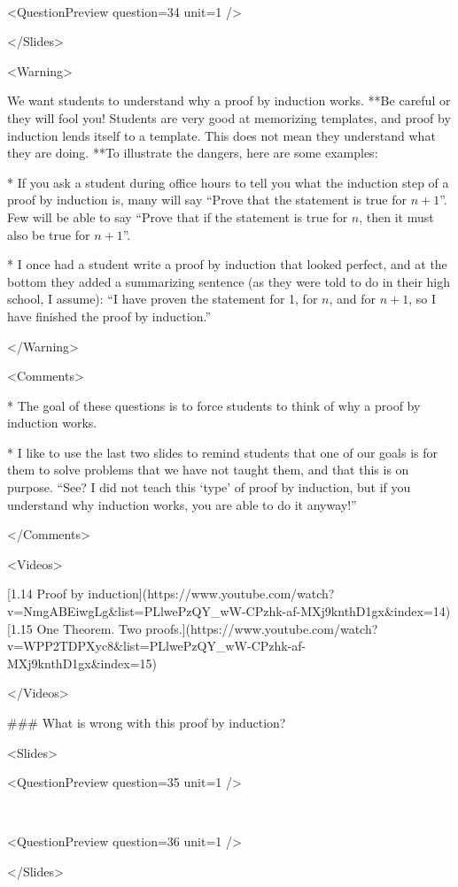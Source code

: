  

<QuestionPreview question={34} unit={1} />

</Slides>

<Warning>

We want students to understand why a proof by induction works. **Be careful or they will fool you! Students are very good at memorizing templates, and proof by induction lends itself to a template. This does not mean they understand what they are doing. **To illustrate the dangers, here are some examples:

*   If you ask a student during office hours to tell you what the induction step of a proof by induction is, many will say “Prove that the statement is true for $n+1$”. Few will be able to say “Prove that if the statement is true for $n$, then it must also be true for $n+1$”.

*   I once had a student write a proof by induction that looked perfect, and at the bottom they added a summarizing sentence (as they were told to do in their high school, I assume): “I have proven the statement for 1, for $n$, and for $n+1$, so I have finished the proof by induction.”

</Warning>

<Comments>

*   The goal of these questions is to force students to think of why a proof by induction works.

*   I like to use the last two slides to remind students that one of our goals is for them to solve problems that we have not taught them, and that this is on purpose. “See? I did not teach this ‘type’ of proof by induction, but if you understand why induction works, you are able to do it anyway!”

</Comments>

<Videos>

[1.14 Proof by induction](https://www.youtube.com/watch?v=NmgABEiwgLg\&list=PLlwePzQY_wW-CPzhk-af-MXj9knthD1gx\&index=14)[1.15 One Theorem. Two proofs.](https://www.youtube.com/watch?v=WPP2TDPXyc8\&list=PLlwePzQY_wW-CPzhk-af-MXj9knthD1gx\&index=15)

</Videos>

### What is wrong with this proof by induction?

<Slides>

<QuestionPreview question={35} unit={1} />

 

<QuestionPreview question={36} unit={1} />

</Slides>

